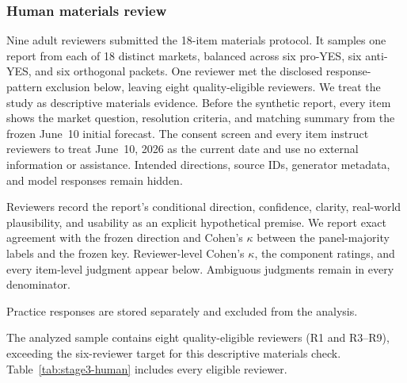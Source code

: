 \subsubsection{Human materials review}
\label{app:exp1-human-review}
Nine adult reviewers submitted the 18-item materials protocol. It samples one
report from each of 18 distinct markets, balanced across six pro-YES, six
anti-YES, and six orthogonal packets. One reviewer met the disclosed
response-pattern exclusion below, leaving eight quality-eligible reviewers.
We treat the study as descriptive materials evidence. Before the synthetic
report, every item shows the market question,
resolution criteria, and matching summary from the frozen June~10 initial
forecast. The consent screen and every item instruct reviewers to treat
June~10, 2026 as the current date and use no external information or assistance.
Intended directions, source IDs, generator
metadata, and model responses remain hidden.

Reviewers record the report's conditional direction, confidence, clarity,
real-world plausibility, and usability as an explicit hypothetical premise.
We report exact agreement with the frozen direction and Cohen's $\kappa$
between the panel-majority labels and the frozen key. Reviewer-level Cohen's
$\kappa$, the component ratings, and every item-level judgment appear below.
Ambiguous judgments remain in every denominator.

Practice responses are stored separately and excluded from the analysis.

The analyzed sample contains eight quality-eligible reviewers (R1 and R3--R9),
exceeding the six-reviewer target for this descriptive materials check.
Table~\ref{tab:stage3-human} includes every eligible reviewer.

